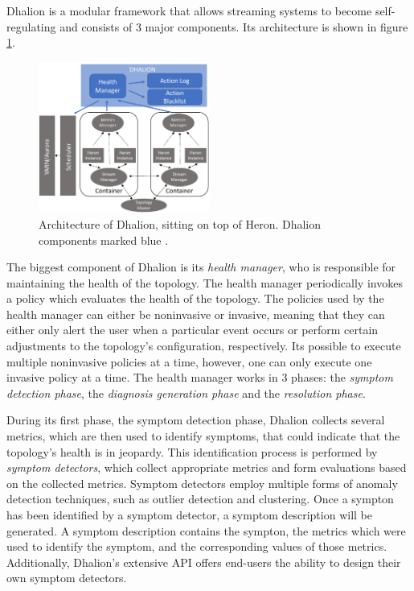         \label{sub:dhalion-architecture}
        Dhalion is a modular framework that allows streaming systems to become self-regulating and consists of 3 major components.
        Its architecture is shown in figure \ref{fig:dhalion}.

        \begin{figure}[hbt]
            \centering
            \includegraphics[width=0.5\textwidth]{Bilder/dhalion.png}
            \caption{
                Architecture of Dhalion, sitting on top of Heron. Dhalion components marked blue \cite{dhalion}.
            }
            \label{fig:dhalion}
        \end{figure}

        \quad The biggest component of Dhalion is its \textit{health manager}, who is responsible for maintaining the health of the topology.
        The health manager periodically invokes a policy which evaluates the health of the topology. 
        The policies used by the health manager can either be noninvasive or invasive, meaning that they can either only alert the user when a particular event occurs or 
        perform certain adjustments to the topology's configuration, respectively.
        Its possible to execute multiple noninvasive policies at a time, however, one can only execute one invasive policy at a time.
        The health manager works in 3 phases: the \textit{symptom detection phase}, the \textit{diagnosis generation phase} and the \textit{resolution phase}.
        
        \quad During its first phase, the symptom detection phase, Dhalion collects several metrics, which are then used to identify symptoms, that could indicate that the 
        topology's health is in jeopardy.
        This identification process is performed by \textit{symptom detectors}, which collect appropriate metrics and form evaluations based on the collected metrics.
        Symptom detectors employ multiple forms of anomaly detection techniques, such as outlier detection and clustering.
        Once a sympton has been identified by a symptom detector, a symptom description will be generated. A symptom description contains the sympton, the metrics which
        were used to identify the symptom, and the corresponding values of those metrics.
        Additionally, Dhalion's extensive API offers end-users the ability to design their own symptom detectors.
        
